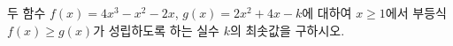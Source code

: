 두 함수 $f(x)=4x^3-x^2-2x$, $g(x)=2x^2+4x-k$에 대하여 $x\ge 1$에서 부등식 $f(x)\ge g(x)$가 성립하도록 하는 실수 $k$의 최솟값을 구하시오.
